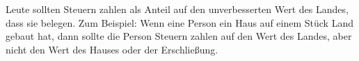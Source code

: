 Leute sollten Steuern zahlen als Anteil auf den unverbesserten Wert des Landes, dass sie belegen.
Zum Beispiel: Wenn eine Person ein Haus auf einem Stück Land gebaut hat, dann sollte die Person Steuern zahlen auf den Wert des Landes, aber nicht den Wert des Hauses oder der Erschließung.